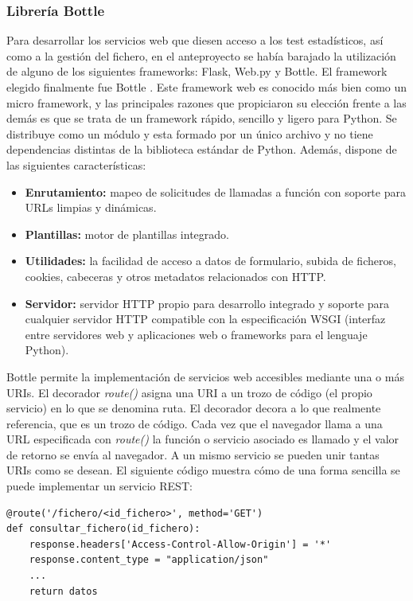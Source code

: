 \subsubsection{\textbf{Librería Bottle}}
Para desarrollar los servicios web que diesen acceso a los test estadísticos, así como a la gestión del fichero, en el anteproyecto se había barajado la utilización de alguno de los siguientes frameworks: Flask, Web.py y Bottle. El framework elegido finalmente fue Bottle \cite{bottle}. Este framework web es conocido más bien como un micro framework, y las principales razones que propiciaron su elección frente a las demás es que se trata de un framework rápido, sencillo y ligero para Python. Se distribuye como un módulo y esta formado por un único archivo y no tiene dependencias distintas de la biblioteca estándar de Python. Además, dispone de las siguientes características:
\begin{itemize}
\item \textbf{Enrutamiento:} mapeo de solicitudes de llamadas a función con soporte para URLs limpias y dinámicas.
\item \textbf{Plantillas:} motor de plantillas integrado.
\item \textbf{Utilidades:} la facilidad de acceso a datos de formulario, subida de ficheros, cookies, cabeceras y otros metadatos relacionados con HTTP.
\item \textbf{Servidor:} servidor HTTP propio para desarrollo integrado y soporte para cualquier servidor HTTP compatible con la especificación WSGI (interfaz entre servidores web y aplicaciones web o frameworks para el lenguaje Python).
\end{itemize}

Bottle permite la implementación de servicios web accesibles mediante una o más URIs. El decorador \textit{route()} asigna una URI a un trozo de código (el propio servicio) en lo que se denomina ruta. El decorador decora a lo que realmente referencia, que es un trozo de código. Cada vez que el navegador llama a una URL especificada con \textit{route()} la función o servicio asociado es llamado y el valor de retorno se envía al navegador. A un mismo servicio se pueden unir tantas URIs como se desean. El siguiente código muestra cómo de una forma sencilla se puede implementar un servicio REST:

\begin{lstlisting}
@route('/fichero/<id_fichero>', method='GET')
def consultar_fichero(id_fichero):
    response.headers['Access-Control-Allow-Origin'] = '*'
    response.content_type = "application/json"
    ...
    return datos
\end{lstlisting}

